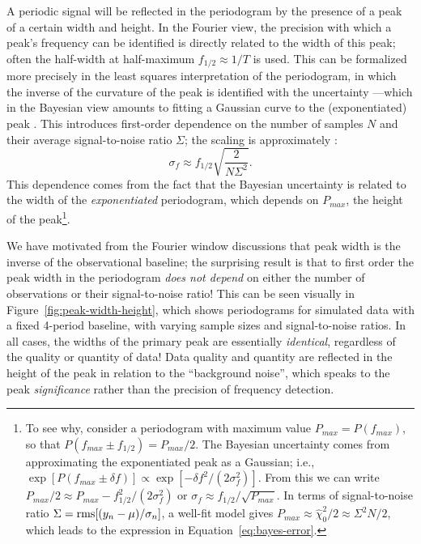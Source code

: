 \documentclass[preprint]{aastex}
\newcommand{\fig}[1]{Figure~\ref{fig:#1}}
\newcommand{\Eq}[1]{Equation~\ref{eq:#1}}
\newcommand{\eq}[1]{\Eq{#1}}
\newcommand{\eqlabel}[1]{\label{eq:#1}}
\begin{document}
A periodic signal will be reflected in the periodogram by the presence of a
peak of a certain width and height.
In the Fourier view, the precision with which a peak's frequency can be
identified is directly related to the width of this peak; often the
half-width at half-maximum $f_{1/2} \approx 1/T$ is used.
This can be formalized more precisely in the least squares interpretation of
the periodogram, in which the inverse of the curvature of the peak is
identified with the uncertainty \citep{ICVG2014}---which in the Bayesian
view amounts to fitting a Gaussian curve to the (exponentiated)
peak \citep{Jaynes87, Bretthorst88}. This introduces first-order
dependence on the number of samples $N$ and their average signal-to-noise
ratio $\Sigma$; the scaling is approximately \citep[see, e.g.][]{Gregory2001}:
\begin{equation}
  \sigma_f \approx f_{1/2} \sqrt{\frac{2}{N\Sigma^2}}.
  \eqlabel{bayes-error}
\end{equation}
This dependence comes from the fact that the Bayesian uncertainty is related
to the width of the {\it exponentiated} periodogram, which
depends on $P_{max}$, the height of the peak\footnote{
To see why, consider a periodogram with maximum value
$P_{max} = P(f_{max})$, so that $P(f_{max} \pm f_{1/2}) = P_{max}/2$.
The Bayesian uncertainty comes from approximating the exponentiated peak as a
Gaussian; i.e., $\exp[P(f_{max} \pm \delta f)] \propto \exp[-\delta f^2/(2\sigma_f^2)]$.
From this we can write $P_{max}/2 \approx P_{max} -f_{1/2}^2 / (2 \sigma_f^2)$ or
$\sigma_f \approx f_{1/2} / \sqrt{P_{max}}$.
In terms of signal-to-noise ratio
$\Sigma = {\rm rms}[(y_n - \mu) / \sigma_n]$,
a well-fit model gives
$P_{max} \approx \hat{\chi}_0^2/2 \approx \Sigma^2 N/2$,
which leads to the expression in \eq{bayes-error}.
}.


We have motivated from the Fourier window discussions that peak width is
the inverse of the observational baseline; the surprising result is that to
first order the peak width in the periodogram {\it does not depend} on
either the number of observations or their signal-to-noise ratio!
This can be seen visually in \fig{peak-width-height},
which shows periodograms for simulated data with a fixed 4-period baseline,
with varying sample sizes and signal-to-noise ratios.
In all cases, the widths of the primary peak are essentially {\it identical},
regardless of the quality or quantity of data!
Data quality and quantity are reflected in the height of the peak in relation
to the ``background noise'', which speaks to the peak {\it significance} rather
than the precision of frequency detection.
\end{document}
